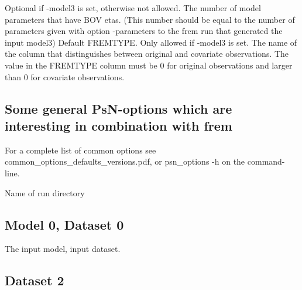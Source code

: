 \begin{optionlist}
\nextopt
{}
Optional if -model3 is set, otherwise not allowed. The number of model parameters that have BOV etas. (This number should be equal to the number of parameters given with option -parameters to the frem run that generated the input model3)  
\nextopt
{}
Default FREMTYPE. Only allowed if -model3 is set. The name of the column that distinguishes between original and covariate observations. The value in the FREMTYPE column must be 0 for original observations and larger than 0 for covariate observations.  
\nextopt
\end{optionlist}


\subsection{Some general PsN-options which are interesting in combination with frem}
For a complete list of common options see common\_options\_defaults\_versions.pdf, or psn\_options -h on the command-line.

\begin{optionlist}
Name of run directory 
\nextopt
\end{optionlist}


\subsection{Model 0, Dataset 0}
The input model, input dataset.

\subsection{Dataset 2}

